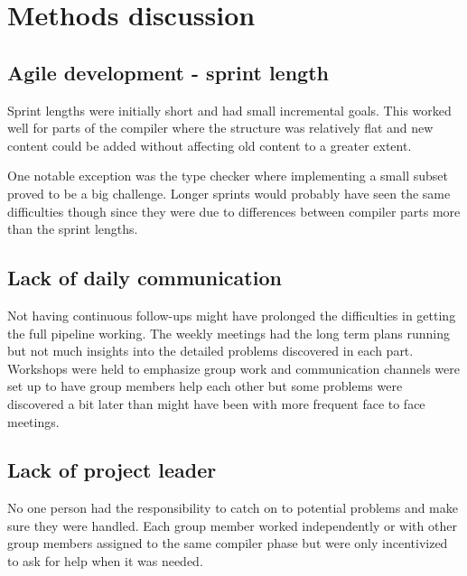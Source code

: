 \section{Methods discussion}


\subsection{Agile development - sprint length}

Sprint lengths were initially short and had small incremental goals. This worked well for parts of the compiler where the structure was relatively flat and new content could be added without affecting old content to a greater extent. 

One notable exception was the type checker where implementing a small subset proved to be a big challenge. Longer sprints would probably have seen the same difficulties though since they were due to differences between compiler parts more than the sprint lengths.

\subsection{Lack of daily communication}

Not having continuous follow-ups might have prolonged the difficulties in getting the full pipeline working. The weekly meetings had the long term plans running but not much insights into the detailed problems discovered in each part. Workshops were held to emphasize group work and communication channels were set up to have group members help each other but some problems were discovered a bit later than might have been with more frequent face to face meetings.

\subsection{Lack of project leader}

No one person had the responsibility to catch on to potential problems and make sure they were handled. Each group member worked independently or with other group members assigned to the same compiler phase but were only incentivized to ask for help when it was needed. 

